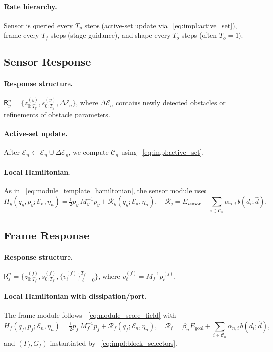 \documentclass{article} %
\begin{document}
\paragraph{Rate hierarchy.}
Sensor is queried every $T_y$ steps (active-set update via ~\cref{eq:impl:active_set}),
frame every $T_f$ steps (stage guidance), and shape every $T_o$ steps (often $T_o{=}1$).

\subsection{Sensor Response}
\label{subsec:sensor_response}

\paragraph{Response structure.}
$\mathsf{R}_y^n=\{z_{0:T_y}^{(y)},s_{0:T_y}^{(y)},\Delta\mathcal{E}_n\}$, where $\Delta\mathcal{E}_n$ contains newly detected obstacles
or refinements of obstacle parameters.

\paragraph{Active-set update.}
After $\mathcal{E}_n \leftarrow \mathcal{E}_n\cup\Delta\mathcal{E}_n$, we compute $\mathcal{C}_n$ using ~\cref{eq:impl:active_set}.

\paragraph{Local Hamiltonian.}
As in ~\cref{eq:module_template_hamiltonian}, the sensor module uses
\[
H_y(q_y,p_y;\mathcal{E}_n,\eta_n)
=\tfrac12 p_y^\top M_y^{-1}p_y+\mathcal{R}_y(q_y;\mathcal{E}_n,\eta_n),
\quad
\mathcal{R}_y=E_{\mathrm{sensor}}+\sum_{i\in\mathcal{C}_n}\alpha_{n,i}\,b(d_i;\hat d).
\]

\subsection{Frame Response}
\label{subsec:frame_response}

\paragraph{Response structure.}
$\mathsf{R}_f^n=\{z_{0:T_f}^{(f)},s_{0:T_f}^{(f)},\{v_\ell^{(f)}\}_{\ell=0}^{T_f}\}$, where $v_\ell^{(f)}=M_f^{-1}p_\ell^{(f)}$.

\paragraph{Local Hamiltonian with dissipation/port.}
The frame module follows ~\cref{eq:module_score_field} with
\[
H_f(q_f,p_f;\mathcal{E}_n,\eta_n)
=\tfrac12 p_f^\top M_f^{-1}p_f+\mathcal{R}_f(q_f;\mathcal{E}_n,\eta_n),
\quad
\mathcal{R}_f=\beta_n E_{\mathrm{goal}}+\sum_{i\in\mathcal{C}_n}\alpha_{n,i}\,b(d_i;\hat d),
\]
and $(\Gamma_f,G_f)$ instantiated by ~\cref{eq:impl:block_selectors}.
\end{document}
